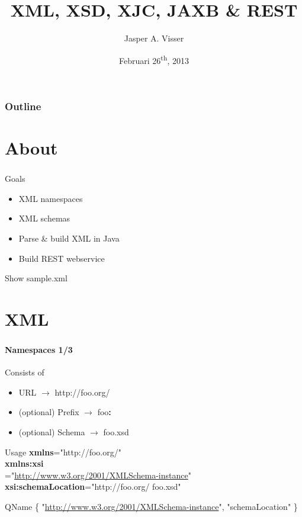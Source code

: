 \documentclass[handout]{beamer}
\title[XML]{XML, XSD, XJC, JAXB \& REST}
\author[Jasper A. Visser]{Jasper A. Visser}
\institute[Portavita]{Portavita BV}
\date{Februari 26\textsuperscript{th}, 2013}
\begin{document}
\begin{frame}
	\inserttitlegraphic
	\vspace{5mm}
	\titlepage
\end{frame}

\begin{frame}
	\frametitle{Outline}
	\tableofcontents
\end{frame}

\section*{About}
\begin{frame}
	\frametitle{\insertsection}
	\begin{block}{Goals}
		\begin{itemize}
			\item XML namespaces
			\item XML schemas
			\item Parse \& build XML in Java
			\item Build REST webservice
		\end{itemize}
	\end{block}
	\begin{semiverbatim}
		Show sample.xml
	\end{semiverbatim}
\end{frame}

\section{XML}
\begin{frame}
	\frametitle{\insertsection}
	\framesubtitle{Namespaces 1/3}
	\begin{block}{Consists of}
		\begin{itemize}
			\item URL $\rightarrow$ http://foo.org/
			\item (optional) Prefix $\rightarrow$ foo\textbf{:}
			\item (optional) Schema $\rightarrow$ foo.xsd
		\end{itemize}
	\end{block}
	\begin{block}{Usage} \small
		\textbf{xmlns}="http://foo.org/" \\
		\textbf{xmlns:xsi}\\="\url{http://www.w3.org/2001/XMLSchema-instance}" \\
		\textbf{xsi:schemaLocation}="http://foo.org/ foo.xsd" \\
	\end{block}
	\begin{block}{QName} \small
		\{ "\url{http://www.w3.org/2001/XMLSchema-instance}", "schemaLocation" \} \\
	\end{block}
\end{frame}
\end{document}
